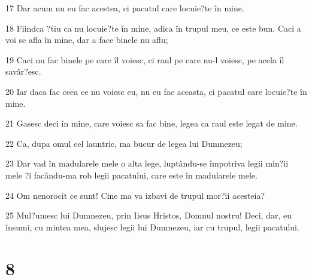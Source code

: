 \par 17 Dar acum nu eu fac acestea, ci pacatul care locuie?te în mine.
\par 18 Fiindca ?tiu ca nu locuie?te în mine, adica în trupul meu, ce este bun. Caci a voi se afla în mine, dar a face binele nu aflu;
\par 19 Caci nu fac binele pe care îl voiesc, ci raul pe care nu-l voiesc, pe acela îl savâr?esc.
\par 20 Iar daca fac ceea ce nu voiesc eu, nu eu fac aceasta, ci pacatul care locuie?te în mine.
\par 21 Gasesc deci în mine, care voiesc sa fac bine, legea ca raul este legat de mine.
\par 22 Ca, dupa omul cel launtric, ma bucur de legea lui Dumnezeu;
\par 23 Dar vad în madularele mele o alta lege, luptându-se împotriva legii min?ii mele ?i facându-ma rob legii pacatului, care este în madularele mele.
\par 24 Om nenorocit ce sunt! Cine ma va izbavi de trupul mor?ii acesteia?
\par 25 Mul?umesc lui Dumnezeu, prin Iisus Hristos, Domnul nostru! Deci, dar, eu însumi, cu mintea mea, slujesc legii lui Dumnezeu, iar cu trupul, legii pacatului.

\chapter{8}

